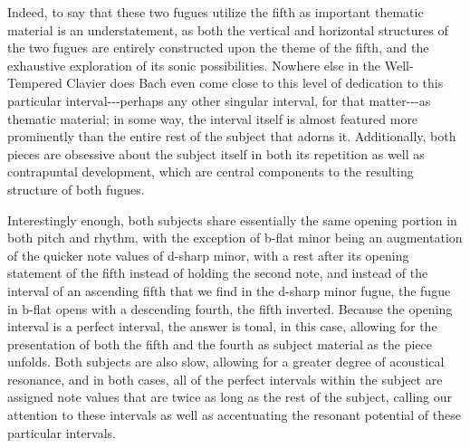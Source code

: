     \begin{center}
    \end{center}
    

    \begin{center}
    \end{center}
    
    Indeed, to say that these two fugues utilize the fifth as important
thematic material is an understatement, as both the vertical and
horizontal structures of the two fugues are entirely constructed upon
the theme of the fifth, and the exhaustive exploration of its sonic
possibilities. Nowhere else in the Well-Tempered Clavier does Bach even
come close to this level of dedication to this particular
interval-\/-\/-perhaps any other singular interval, for that
matter-\/-\/-as thematic material; in some way, the interval itself is
almost featured more prominently than the entire rest of the subject
that adorns it. Additionally, both pieces are obsessive about the
subject itself in both its repetition as well as contrapuntal
development, which are central components to the resulting structure of
both fugues.

Interestingly enough, both subjects share essentially the same opening
portion in both pitch and rhythm, with the exception of b-flat minor
being an augmentation of the quicker note values of d-sharp minor, with
a rest after its opening statement of the fifth instead of holding the
second note, and instead of the interval of an ascending fifth that we
find in the d-sharp minor fugue, the fugue in b-flat opens with a
descending fourth, the fifth inverted. Because the opening interval is a
perfect interval, the answer is tonal, in this case, allowing for the
presentation of both the fifth and the fourth as subject material as the
piece unfolds. Both subjects are also slow, allowing for a greater
degree of acoustical resonance, and in both cases, all of the perfect
intervals within the subject are assigned note values that are twice as
long as the rest of the subject, calling our attention to these
intervals as well as accentuating the resonant potential of these
particular intervals.

